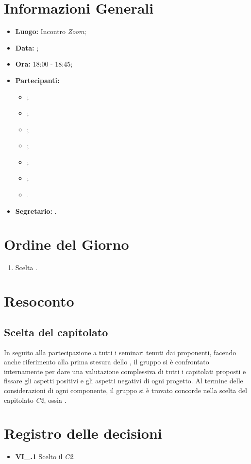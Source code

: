 \section{Informazioni Generali}
\begin{itemize}
\item \textbf{Luogo:} Incontro \textit{Zoom};
\item \textbf{Data:} \Data;
\item \textbf{Ora:} 18:00 - 18:45;
\item \textbf{Partecipanti:}
	\begin{itemize}
		\item \BL{}; 
		\item \FF{};
		\item \MM{}; 
		\item \PC{};
		\item \TG{};
		\item \TL{};
		\item \VD{}.
	\end{itemize} 
\item \textbf{Segretario:} \PC{}.
\end{itemize}

\section{Ordine del Giorno}
\begin{enumerate}
 \item Scelta .
\end{enumerate}

\section{Resoconto}
\subsection{Scelta del capitolato}
In seguito alla partecipazione a tutti i seminari tenuti dai proponenti, facendo anche riferimento alla prima stesura dello \textit{\SdF}, il gruppo si è confrontato internamente per dare una valutazione complessiva di tutti i capitolati proposti e fissare gli aspetti positivi e gli aspetti negativi di ogni progetto.
Al termine delle considerazioni di ogni componente, il gruppo si è trovato concorde nella scelta del capitolato \textit{C2}, ossia \NomeProgetto.

\section{Registro delle decisioni}
\begin{itemize}
	\item \textbf{VI\_\Data.1} Scelto il  \textit{C2}.
\end{itemize}




